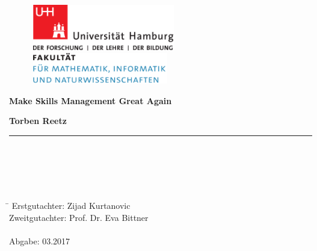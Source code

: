 \begin{titlepage}

  \setcounter{page}{-1}

	\begin{figure}[h]
		\begin{minipage}[b]{62mm}
			\includegraphics[width=62mm]{images/unilogo}
		\end{minipage}
		\hspace{4cm}
		\begin{minipage}[b]{59mm}
			\includegraphics[width=59mm]{images/minlogo}
		\end{minipage}
	\end{figure}

	\vfill
	
	\begin{center}
		\vspace{14mm}
		\noindent \textbf{\huge
		  Make Skills Management Great Again\\
		}
		\vspace{60mm}	
	\end{center}
	
	\vfill
	
	\noindent \textbf{Torben Reetz} \\
	\noindent \rule{\textwidth}{0.4mm} 
	 \\
	 \\
	 \\
	 \\
	\begin{tabbing}
	\hspace{8em} \=  \kill
	Erstgutachter: \> Zijad Kurtanovic \\
	Zweitgutachter: \> Prof. Dr. Eva Bittner \\
	~ \\
	Abgabe: 03.2017
	\end{tabbing}
	

\end{titlepage}

